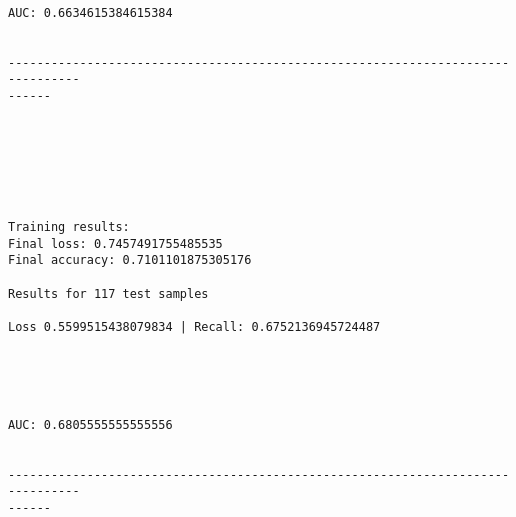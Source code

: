 \documentclass[11pt]{article}
\begin{document}
    \begin{center}
    \end{center}
    { \hspace*{\fill} \\}
    
    \begin{Verbatim}[commandchars=\\\{\}]
AUC: 0.6634615384615384


--------------------------------------------------------------------------------
------


    \end{Verbatim}

    \begin{center}
    \end{center}
    { \hspace*{\fill} \\}
    
    \begin{center}
    \end{center}
    { \hspace*{\fill} \\}
    
    \begin{Verbatim}[commandchars=\\\{\}]

Training results:
Final loss: 0.7457491755485535
Final accuracy: 0.7101101875305176

Results for 117 test samples

Loss 0.5599515438079834 | Recall: 0.6752136945724487



    \end{Verbatim}

    \begin{center}
    \end{center}
    { \hspace*{\fill} \\}
    
    \begin{Verbatim}[commandchars=\\\{\}]
AUC: 0.6805555555555556


--------------------------------------------------------------------------------
------


    \end{Verbatim}
\end{document}
